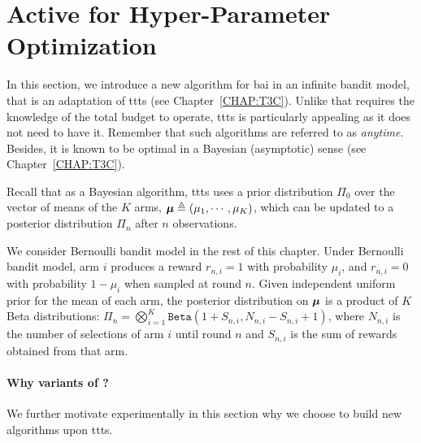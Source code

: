 \section{Active \TTTS{} for Hyper-Parameter Optimization}\label{sec:dttts.algorithm}

In this section, we introduce a new algorithm for \gls{bai} in an infinite bandit model, that is an adaptation of \gls{ttts}{} (see Chapter~\ref{CHAP:T3C}). Unlike \SHA{} that requires the knowledge of the total budget to operate, \gls{ttts}{} is particularly appealing as it does not need to have it. Remember that such algorithms are referred to as \emph{anytime}. Besides, it is known to be optimal in a Bayesian (asymptotic) sense (see Chapter~\ref{CHAP:T3C}).

Recall that as a Bayesian algorithm, \gls{ttts} uses a prior distribution $\Pi_0$ over the vector of means of the $K$ arms, ${\boldsymbol \mu} \triangleq (\mu_1,\cdots,\mu_K)$, which can be updated to a posterior distribution $\Pi_n$ after $n$ observations. 

We consider Bernoulli bandit model in the rest of this chapter. Under Bernoulli bandit model, arm $i$ produces a reward $r_{n,i}=1$ with probability $\mu_i$, and $r_{n,i}=0$ with probability $1-\mu_i$ when sampled at round $n$. Given independent uniform prior for the mean of each arm, the posterior distribution on ${\boldsymbol \mu}$ is a product of $K$ Beta distributions: $\Pi_n = \bigotimes_{i=1}^{K} \texttt{Beta}(1+S_{n,i},N_{n,i}-S_{n,i}+1)$, where $N_{n,i}$ is the number of selections of arm $i$ until round $n$ and $S_{n,i}$ is the sum of rewards obtained from that arm. 

\paragraph{Why variants of \TTTS{}?}
We further motivate experimentally in this section why we choose to build new algorithms upon \gls{ttts}.

